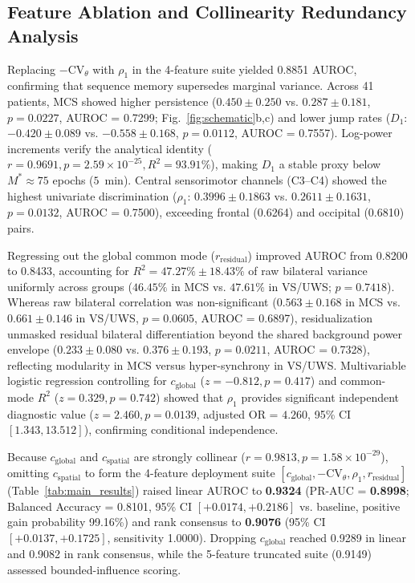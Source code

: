 \documentclass[journal,twoside,web]{ieeecolor}
\begin{document}
\subsection{Feature Ablation and Collinearity Redundancy Analysis}\label{sec:results_ablation}
Replacing $-\mathrm{CV}_\theta$ with $\rho_1$ in the 4-feature suite yielded 0.8851 AUROC, confirming that sequence memory supersedes marginal variance. Across 41 patients, MCS showed higher persistence ($0.450 \pm 0.250$ vs. $0.287 \pm 0.181$, $p = 0.0227$, AUROC = 0.7299; Fig.~\ref{fig:schematic}b,c) and lower jump rates ($D_1$: $-0.420 \pm 0.089$ vs. $-0.558 \pm 0.168$, $p = 0.0112$, AUROC = 0.7557). Log-power increments verify the analytical identity ($r = 0.9691, p = 2.59 \times 10^{-25}, R^2 = 93.91\%$), making $D_1$ a stable proxy below $M^* \approx 75$ epochs ($5$~min). Central sensorimotor channels (C3--C4) showed the highest univariate discrimination ($\rho_1$: $0.3996 \pm 0.1863$ vs. $0.2611 \pm 0.1631$, $p = 0.0132$, AUROC = 0.7500), exceeding frontal (0.6264) and occipital (0.6810) pairs.

Regressing out the global common mode ($r_{\text{residual}}$) improved AUROC from 0.8200 to 0.8433, accounting for $R^2 = 47.27\% \pm 18.43\%$ of raw bilateral variance uniformly across groups ($46.45\%$ in MCS vs. $47.61\%$ in VS/UWS; $p = 0.7418$). Whereas raw bilateral correlation was non-significant ($0.563 \pm 0.168$ in MCS vs. $0.661 \pm 0.146$ in VS/UWS, $p = 0.0605$, AUROC = 0.6897), residualization unmasked residual bilateral differentiation beyond the shared background power envelope ($0.233 \pm 0.080$ vs. $0.376 \pm 0.193$, $p = 0.0211$, AUROC = 0.7328), reflecting modularity in MCS versus hyper-synchrony in VS/UWS. Multivariable logistic regression controlling for $c_{\text{global}}$ ($z = -0.812, p = 0.417$) and common-mode $R^2$ ($z = 0.329, p = 0.742$) showed that $\rho_1$ provides significant independent diagnostic value ($z = 2.460, p = 0.0139$, adjusted OR = $4.260$, 95\% CI $[1.343, 13.512]$), confirming conditional independence.

Because $c_{\text{global}}$ and $c_{\text{spatial}}$ are strongly collinear ($r = 0.9813, p = 1.58 \times 10^{-29}$), omitting $c_{\text{spatial}}$ to form the 4-feature deployment suite $[c_{\text{global}}, -\mathrm{CV}_\theta, \rho_1, r_{\text{residual}}]$ (Table~\ref{tab:main_results}) raised linear AUROC to \textbf{0.9324} (PR-AUC = \textbf{0.8998}; Balanced Accuracy = 0.8101, 95\% CI $[+0.0174, +0.2186]$ vs. baseline, positive gain probability 99.16\%) and rank consensus to \textbf{0.9076} (95\% CI $[+0.0137, +0.1725]$, sensitivity 1.0000). Dropping $c_{\text{global}}$ reached 0.9289 in linear and 0.9082 in rank consensus, while the 5-feature truncated suite (0.9149) assessed bounded-influence scoring.
\end{document}
